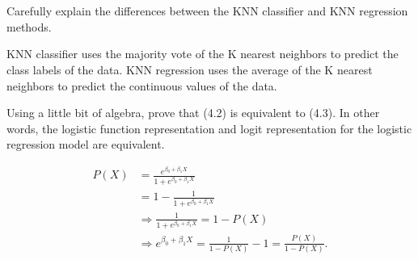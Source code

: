 \documentclass[14pt]{elegantbook}
\begin{document}

\setcounter{chapter}{1}
\chapter{}

\begin{exercise*}[3.2]
  Carefully explain the differences between the KNN classifier and KNN regression methods. 
\end{exercise*}

\begin{solution}
  KNN classifier uses the majority vote of the K nearest neighbors to predict the class labels of the data. KNN regression uses the average of the K nearest neighbors to predict the continuous values of the data. 
\end{solution}

\begin{exercise*}[4.1]
  Using a little bit of algebra, prove that (4.2) is equivalent to (4.3). In other words, the logistic function representation and logit representation for the logistic regression model are equivalent. 
\end{exercise*}

\begin{solution}
  \begin{align*}
    P(X)&=\frac{e^{\beta_0+\beta_1X}}{1+e^{\beta_0+\beta_1X}}\\
    &=1-\frac{1}{1+e^{\beta_0+\beta_1X}}\\
    &\Rightarrow\frac{1}{1+e^{\beta_0+\beta_1X}}=1-P(X)\\
    &\Rightarrow e^{\beta_0+\beta_1X}=\frac{1}{1-P(X)}-1=\frac{P(X)}{1-P(X)}. 
  \end{align*}
\end{solution}
\end{document}
